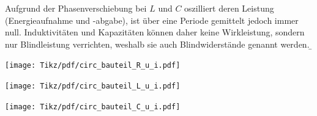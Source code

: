 \begin{frame}
{    Aufgrund der Phasenverschiebung bei $L$ und $C$ oszilliert deren Leistung 
    (Energieaufnahme und -abgabe), ist über eine Periode gemittelt jedoch immer null.
    Induktivitäten und Kapazitäten können daher keine Wirkleistung, sondern nur Blindleistung
    verrichten, weshalb sie auch Blindwiderstände genannt werden.
}
\b{%
    \begin{minipage}{\textwidth}\centering
        \begin{minipage}{0.28\textwidth}\centering
            \texttt{[image: Tikz/pdf/circ\_bauteil\_R\_u\_i.pdf]}%
        \end{minipage}\hfill%
        \begin{minipage}{0.28\textwidth}\centering
            \texttt{[image: Tikz/pdf/circ\_bauteil\_L\_u\_i.pdf]}%
        \end{minipage}\hfill%
        \begin{minipage}{0.28\textwidth}\centering
            \texttt{[image: Tikz/pdf/circ\_bauteil\_C\_u\_i.pdf]}%
        \end{minipage}
    \end{minipage}
}%
\end{frame}


